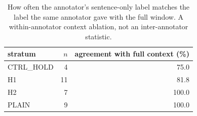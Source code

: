 \begin{table}[t]
\centering\small
\begin{tabular}{lrr}
\toprule
stratum & $n$ & agreement with full context (\%) \\
\midrule
CTRL\_HOLD & 4 & 75.0 \\
H1 & 11 & 81.8 \\
H2 & 7 & 100.0 \\
PLAIN & 9 & 100.0 \\
\bottomrule
\end{tabular}
\caption{How often the annotator's sentence-only label matches the label the same annotator gave with the full window. A within-annotator context ablation, not an inter-annotator statistic.}
\label{tab:humanabl}
\end{table}
